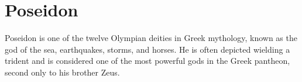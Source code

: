 \section{Poseidon}
Poseidon is one of the twelve Olympian deities in Greek mythology, known as the god of the sea, earthquakes, storms, and horses. He is often depicted wielding a trident and is considered one of the most powerful gods in the Greek pantheon, second only to his brother Zeus.

